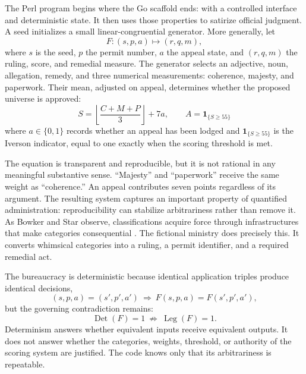 \documentclass[11pt]{article}
\begin{document}
The Perl program begins where the Go scaffold ends: with a controlled interface and deterministic state. It then uses those properties to satirize official judgment. A seed initializes a small linear-congruential generator. More generally, let
\begin{equation}
  F:(s,p,a)\longmapsto(r,q,m),
  \label{eq:bureaucracy-function}
\end{equation}
where $s$ is the seed, $p$ the permit number, $a$ the appeal state, and $(r,q,m)$ the ruling, score, and remedial measure. The generator selects an adjective, noun, allegation, remedy, and three numerical measurements: coherence, majesty, and paperwork. Their mean, adjusted on appeal, determines whether the proposed universe is approved:
\begin{equation}
  S = \left\lfloor\frac{C + M + P}{3}\right\rfloor + 7a,
  \qquad
  A = \mathbf{1}_{\{S \geq 55\}}
\end{equation}
where $a \in \{0,1\}$ records whether an appeal has been lodged and $\mathbf{1}_{\{S \geq 55\}}$ is the Iverson indicator, equal to one exactly when the scoring threshold is met.

The equation is transparent and reproducible, but it is not rational in any meaningful substantive sense. ``Majesty'' and ``paperwork'' receive the same weight as ``coherence.'' An appeal contributes seven points regardless of its argument. The resulting system captures an important property of quantified administration: reproducibility can stabilize arbitrariness rather than remove it. As Bowker and Star observe, classifications acquire force through infrastructures that make categories consequential \cite{bowkerstar1999}. The fictional ministry does precisely this. It converts whimsical categories into a ruling, a permit identifier, and a required remedial act.

The bureaucracy is deterministic because identical application triples produce identical decisions,
\begin{equation}
  (s,p,a)=(s',p',a')\ \Longrightarrow\ F(s,p,a)=F(s',p',a'),
\end{equation}
but the governing contradiction remains:
\begin{equation}
  \operatorname{Det}(F)=1\ \not\Rightarrow\ \operatorname{Leg}(F)=1.
  \label{eq:reproducibility-legitimacy}
\end{equation}
Determinism answers whether equivalent inputs receive equivalent outputs. It does not answer whether the categories, weights, threshold, or authority of the scoring system are justified. The code knows only that its arbitrariness is repeatable.
\end{document}
